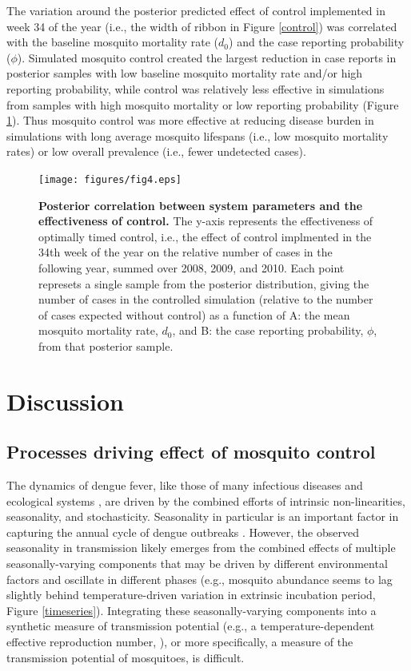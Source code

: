 \documentclass[10pt,letterpaper]{article}
\begin{document}
The variation around the posterior predicted effect of control implemented in week 34 of the year (i.e., the width of ribbon in Figure \ref{control}) was correlated with the baseline mosquito mortality rate ($d_0$) and the case reporting probability ($\phi$).
Simulated mosquito control created the largest reduction in case reports in posterior samples with low baseline mosquito mortality rate and/or high reporting probability, while control was relatively less effective in simulations from samples with high mosquito mortality or low reporting probability (Figure \ref{correlations}).
Thus mosquito control was more effective at reducing disease burden in simulations with long average mosquito lifespans (i.e., low mosquito mortality rates) or low overall prevalence (i.e., fewer undetected cases). 


\begin{figure}[!h]
\texttt{[image: figures/fig4.eps]}
\caption{{\bf Posterior correlation between system parameters and the effectiveness of control.}
The y-axis represents the effectiveness of optimally timed control, i.e., the effect of control implmented in the 34th week of the year on the relative number of cases in the following year, summed over 2008, 2009, and 2010.
Each point represets a single sample from the posterior distribution, giving the number of cases in the controlled simulation (relative to the number of cases expected without control) as a function of A: the mean mosquito mortality rate, $d_0$, and B: the case reporting probability, $\phi$, from that posterior sample.
}
\label{correlations}
\end{figure}

\section*{Discussion}

\subsection*{Processes driving effect of mosquito control}

The dynamics of dengue fever, like those of many infectious diseases \cite{Ellner1998,Koelle2004} and ecological systems \cite{Bjornstad2001}, are driven by the combined efforts of intrinsic non-linearities, seasonality, and stochasticity.
Seasonality in particular is an important factor in capturing the annual cycle of dengue outbreaks \cite{Wearing2006,Aguiar2011,Reich2013}.
However, the observed seasonality in transmission likely emerges from the combined effects of multiple seasonally-varying components that may be driven by different environmental factors and oscillate in different phases (e.g., mosquito abundance seems to lag slightly behind temperature-driven variation in extrinsic incubation period, Figure \ref{timeseries}).
Integrating these seasonally-varying components into a synthetic measure of transmission potential (e.g., a temperature-dependent effective reproduction number, \cite{Codeco2018}), or more specifically, a measure of the transmission potential of mosquitoes, is difficult.
\end{document}
